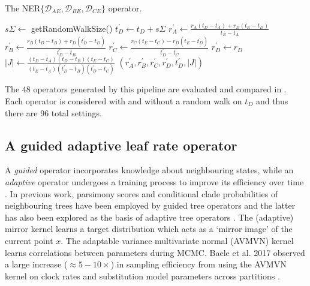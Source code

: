 \documentclass[10pt,letterpaper]{article}
\begin{document}
\begin{algorithm}
\caption{The NER$\{ \mathcal{D}_{AE}, \mathcal{D}_{BE}, \mathcal{D}_{CE} \}$ operator.}
\begin{algorithmic}[1]


	\State
    \State $s\Sigma \leftarrow $ getRandomWalkSize() 
    \State $t_D^\prime \leftarrow t_D + s\Sigma$ 
    \State
    \State $r_A^\prime \leftarrow \frac{r_A(t_D - t_A) + r_D(t_E - t_D)}{t_E - t_A}$ 
    \State $r_B^\prime \leftarrow \frac{r_B(t_D - t_B) + r_D(t_D^\prime - t_D)}{t_D^\prime - t_B}$
    \State $r_C^\prime \leftarrow \frac{r_C(t_E - t_C) - r_D(t_E - t_D^\prime)}{t_D^\prime - t_C}$
    \State $r_D^\prime \leftarrow r_D$
    \State
    \State $|J| \leftarrow \frac{(t_D - t_A)(t_D - t_B)(t_E - t_C)}{(t_E - t_A)(t_D^\prime - t_B)(t_D^\prime - t_C)}$ 
    \State \Return $(r_A^\prime, r_B^\prime, r_C^\prime, r_D^\prime, t_D^\prime, |J|)$
    
\EndProcedure

\end{algorithmic}
\label{alg:NER2}
\end{algorithm}

The 48 operators generated by this pipeline are evaluated and compared in \textbf{}. Each operator is considered with and without a random walk on $t_D$ and thus there are 96 total settings.



\clearpage
\subsection*{A guided adaptive leaf rate operator}
\label{AVMVN_sect}

A \textit{guided} operator incorporates knowledge about neighbouring states, while an \textit{adaptive} operator undergoes a training process to improve its efficiency over time \cite{roberts2007coupling}. In previous work, parsimony scores and conditional clade probabilities of neighbouring trees have been employed by guided tree operators \cite{hohna2012guided,zhang2020using,meyer2019adaptive} and the latter has also been explored as the basis of  adaptive tree operators \cite{hohna2012guided,meyer2019adaptive}. The (adaptive) mirror kernel \cite{thawornwattana2018designing} learns a target distribution which acts as a `mirror image' of the current point $x$.  The adaptable variance multivariate normal (AVMVN) kernel \cite{baele2017adaptive,suchard2018bayesian} learns correlations between parameters during MCMC. Baele et al. 2017  observed a large increase ($\approx 5-10 \times$) in sampling efficiency from using the AVMVN kernel on clock rates and substitution model parameters across partitions \cite{baele2017adaptive}.  
\end{document}
